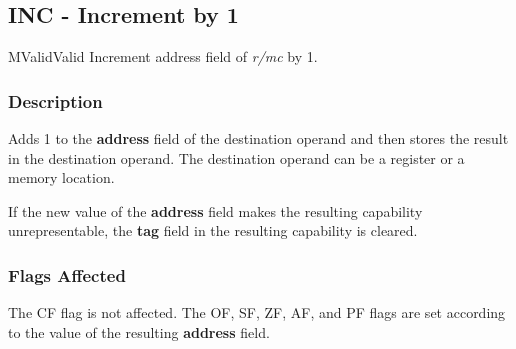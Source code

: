 \clearpage
{}
{}
\subsection*{INC - Increment by 1}

\begin{x86opcodetable}
  {M}{Valid}{Valid}
  {Increment address field of \emph{r/mc} by 1.}
\end{x86opcodetable}

\begin{x86opentable}
\end{x86opentable}

\subsubsection*{Description}

Adds 1 to the \textbf{address} field of the destination operand and
then stores the result in the destination operand. The destination
operand can be a register or a memory location.

If the new value of the \textbf{address} field makes the resulting
capability unrepresentable, the \textbf{tag} field in the resulting
capability is cleared.

\subsubsection*{Flags Affected}

The CF flag is not affected.  The OF, SF, ZF, AF, and PF flags are set
according to the value of the resulting \textbf{address} field.
